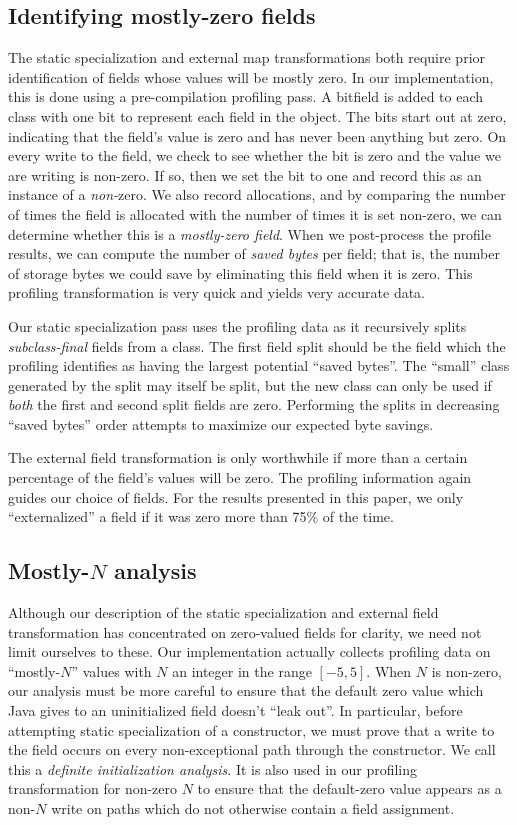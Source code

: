 \documentclass[preprint]{acmconf}
\begin{document}
\subsection{Identifying mostly-zero fields}

The static specialization and external map transformations both
require prior identification of fields whose values will be mostly
zero.  In our implementation, this is done using a pre-compilation
profiling pass.  A bitfield is added to each class with one bit to
represent each field in the object.  The bits start out at zero,
indicating that the field's value is zero and has never been anything
but zero.  On every write to the field, we check to see whether the
bit is zero and the value we are writing is non-zero.  If so, then
we set the bit to one and record this as an instance of a {\it
  non-}zero.  We also record allocations, and by comparing the number
of times the field is allocated with the number of times it is set
non-zero, we can determine whether this is a {\it mostly-zero field}.
When we post-process the profile results, we can compute the number 
of {\it saved bytes} per field; that is, the number of storage bytes
we could save by eliminating this field when it is zero.
This profiling transformation is very quick and yields very accurate
data.

Our static specialization pass uses the profiling data as it
recursively splits {\it subclass-final} fields from a class.  The
first field split should be the field which the profiling identifies
as having the largest potential ``saved bytes''.  The ``small'' class
generated by the split may itself be split, but the new class can only
be used if {\it both} the first and second split fields are zero.
Performing the splits in decreasing ``saved bytes'' order attempts to
maximize our expected byte savings.

The external field transformation is only worthwhile if more than a
certain percentage of the field's values will be zero.  The profiling
information again guides our choice of fields.  For the results
presented in this paper, we only ``externalized'' a field if it was
zero more than 75\% of the time.

\subsection{Mostly-$N$ analysis}
Although our description of the static specialization and external
field transformation has concentrated on zero-valued fields for
clarity, we need not limit ourselves to these.  Our implementation
actually collects profiling data on ``mostly-$N$'' values
with $N$ an integer in the range $[-5,5]$.  When $N$ is non-zero,
our analysis must be more careful to ensure that the default zero
value which Java gives to an uninitialized field doesn't ``leak out''.
In particular, before attempting static specialization of a
constructor, we must prove that a write to the field occurs on every
non-exceptional path through the constructor.  We call this a {\it
  definite initialization analysis}.  It is also used in our profiling
transformation for non-zero $N$ to ensure that the default-zero value
appears as a non-$N$ write on paths which do not otherwise contain a
field assignment.
\end{document}
